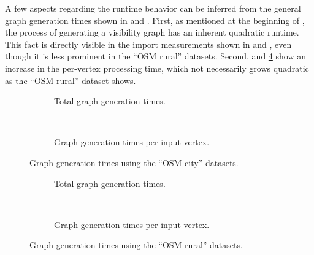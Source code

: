 			A few aspects regarding the runtime behavior can be inferred from the general graph generation times shown in  and .
			First, as mentioned at the beginning of , the process of generating a visibility graph has an inherent quadratic runtime.
			This fact is directly visible in the import measurements shown in  and , even though it is less prominent in the \enquote{OSM rural} datasets.
			Second,  and \ref{fig:eval-import-rural-rel} show an increase in the per-vertex processing time, which not necessarily grows quadratic as the \enquote{OSM rural} dataset shows.
			
			\begin{figure}[h!]
				\begin{minipage}{.48\textwidth}
					\begin{subfigure}[t]{\linewidth}
						\begin{figcenter}
							
						\end{figcenter}
						\caption{Total graph generation times.}
						\label{fig:eval-import-city-abs}
					\end{subfigure}
					\\[3ex]
					\begin{subfigure}[t]{\linewidth}
						\begin{figcenter}
							
						\end{figcenter}
						\caption{Graph generation times per input vertex.}
						\label{fig:eval-import-city-rel}
					\end{subfigure}
					\caption{Graph generation times using the \enquote{OSM city} datasets.}
					\label{fig:eval-import-city}
				\end{minipage}
				\hfill
				\begin{minipage}{.48\textwidth}
					\begin{subfigure}[t]{\linewidth}
						\begin{figcenter}
							
						\end{figcenter}
						\caption{Total graph generation times.}
						\label{fig:eval-import-rural-abs}
					\end{subfigure}
					\\[3ex]
					\begin{subfigure}[t]{\linewidth}
						\begin{figcenter}
							
						\end{figcenter}
						\caption{Graph generation times per input vertex.}
						\label{fig:eval-import-rural-rel}
					\end{subfigure}
					\caption{Graph generation times using the \enquote{OSM rural} datasets.}
					\label{fig:eval-import-rural}
				\end{minipage}
			\end{figure}
			
